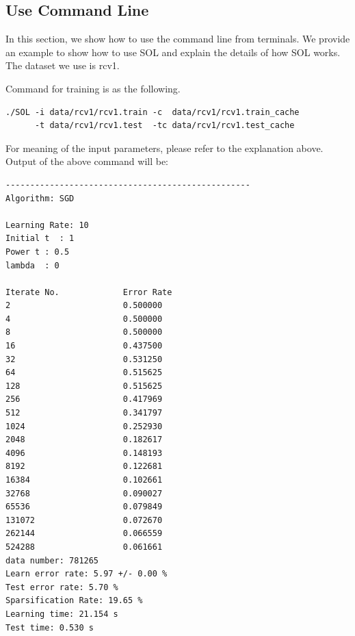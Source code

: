 \documentclass[11pt,a4paper]{article}
\begin{document}
\subsection{Use Command Line}
In this section, we show how to use the command line from terminals. We provide
an example to show how to use SOL and explain the details of how SOL works. The
dataset we use is rcv1.

Command for training is as the following.
\lstset{language=bash,
framexleftmargin=0.5cm,
xleftmargin=0.5cm,
}
\begin{lstlisting}
./SOL -i data/rcv1/rcv1.train -c  data/rcv1/rcv1.train_cache 
      -t data/rcv1/rcv1.test  -tc data/rcv1/rcv1.test_cache
\end{lstlisting}

For meaning of the input parameters, please refer to the explanation above.
Output of the above command will be:
\lstset{language=bash}
\begin{lstlisting}
--------------------------------------------------
Algorithm: SGD

Learning Rate: 10
Initial t  : 1
Power t : 0.5
lambda  : 0

Iterate No.             Error Rate
2                       0.500000
4                       0.500000
8                       0.500000
16                      0.437500
32                      0.531250
64                      0.515625
128                     0.515625
256                     0.417969
512                     0.341797
1024                    0.252930
2048                    0.182617
4096                    0.148193
8192                    0.122681
16384                   0.102661
32768                   0.090027
65536                   0.079849
131072                  0.072670
262144                  0.066559
524288                  0.061661
data number: 781265
Learn error rate: 5.97 +/- 0.00 %
Test error rate: 5.70 %
Sparsification Rate: 19.65 %
Learning time: 21.154 s
Test time: 0.530 s
\end{lstlisting}
\end{document}
